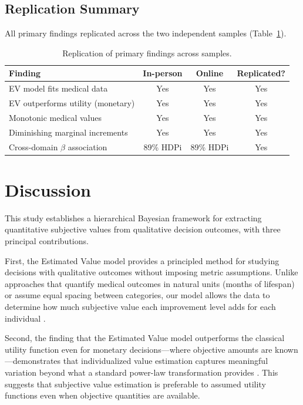 \documentclass[11pt]{article}
\begin{document}
\subsection{Replication Summary}

All primary findings replicated across the two independent samples (Table~\ref{tab:replication}).

\begin{table}[H]
\centering
\caption{Replication of primary findings across samples.}
\label{tab:replication}
\begin{tabular}{lccc}
\toprule
\textbf{Finding} & \textbf{In-person} & \textbf{Online} & \textbf{Replicated?} \\
\midrule
EV model fits medical data & Yes & Yes & Yes \\
EV outperforms utility (monetary) & Yes & Yes & Yes \\
Monotonic medical values & Yes & Yes & Yes \\
Diminishing marginal increments & Yes & Yes & Yes \\
Cross-domain $\beta$ association & 89\% HDPi & 89\% HDPi & Yes \\
\bottomrule
\end{tabular}
\end{table}

\section{Discussion}

This study establishes a hierarchical Bayesian framework for extracting quantitative subjective values from qualitative decision outcomes, with three principal contributions.

First, the Estimated Value model provides a principled method for studying decisions with qualitative outcomes without imposing metric assumptions. Unlike approaches that quantify medical outcomes in natural units (months of lifespan) or assume equal spacing between categories, our model allows the data to determine how much subjective value each improvement level adds for each individual \citep{busemeyer2002survey}.

Second, the finding that the Estimated Value model outperforms the classical utility function even for monetary decisions---where objective amounts are known---demonstrates that individualized value estimation captures meaningful variation beyond what a standard power-law transformation provides \citep{kahneman1979prospect, tversky1992advances}. This suggests that subjective value estimation is preferable to assumed utility functions even when objective quantities are available.
\end{document}
